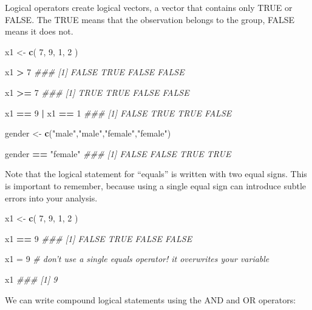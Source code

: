 \documentclass[]{book}
\newenvironment{Shaded}{\begin{snugshade}}{\end{snugshade}}
\newcommand{\CommentTok}[1]{\textcolor[rgb]{0.56,0.35,0.01}{\textit{#1}}}
\newcommand{\DecValTok}[1]{\textcolor[rgb]{0.00,0.00,0.81}{#1}}
\newcommand{\KeywordTok}[1]{\textcolor[rgb]{0.13,0.29,0.53}{\textbf{#1}}}
\newcommand{\NormalTok}[1]{#1}
\newcommand{\OperatorTok}[1]{\textcolor[rgb]{0.81,0.36,0.00}{\textbf{#1}}}
\newcommand{\StringTok}[1]{\textcolor[rgb]{0.31,0.60,0.02}{#1}}
\theoremstyle{definition}
\theoremstyle{definition}
\theoremstyle{definition}
\theoremstyle{remark}
\begin{document}
Logical operators create logical vectors, a vector that contains only
TRUE or FALSE. The TRUE means that the observation belongs to the group,
FALSE means it does not.

\begin{Shaded}
\begin{Highlighting}[]
\NormalTok{x1 <-}\StringTok{ }\KeywordTok{c}\NormalTok{( }\DecValTok{7}\NormalTok{, }\DecValTok{9}\NormalTok{, }\DecValTok{1}\NormalTok{, }\DecValTok{2}\NormalTok{ )}

\NormalTok{x1 }\OperatorTok{>}\StringTok{ }\DecValTok{7}
\CommentTok{### [1] FALSE  TRUE FALSE FALSE}

\NormalTok{x1 }\OperatorTok{>=}\StringTok{ }\DecValTok{7}
\CommentTok{### [1]  TRUE  TRUE FALSE FALSE}

\NormalTok{x1 }\OperatorTok{==}\StringTok{ }\DecValTok{9} \OperatorTok{|}\StringTok{ }\NormalTok{x1 }\OperatorTok{==}\StringTok{ }\DecValTok{1}
\CommentTok{### [1] FALSE  TRUE  TRUE FALSE}

\NormalTok{gender <-}\StringTok{ }\KeywordTok{c}\NormalTok{(}\StringTok{"male"}\NormalTok{,}\StringTok{"male"}\NormalTok{,}\StringTok{"female"}\NormalTok{,}\StringTok{"female"}\NormalTok{)}

\NormalTok{gender }\OperatorTok{==}\StringTok{ "female"}
\CommentTok{### [1] FALSE FALSE  TRUE  TRUE}
\end{Highlighting}
\end{Shaded}

Note that the logical statement for ``equals'' is written with two equal
signs. This is important to remember, because using a single equal sign
can introduce subtle errors into your analysis.

\begin{Shaded}
\begin{Highlighting}[]
\NormalTok{x1 <-}\StringTok{ }\KeywordTok{c}\NormalTok{( }\DecValTok{7}\NormalTok{, }\DecValTok{9}\NormalTok{, }\DecValTok{1}\NormalTok{, }\DecValTok{2}\NormalTok{ )}

\NormalTok{x1 }\OperatorTok{==}\StringTok{ }\DecValTok{9}
\CommentTok{### [1] FALSE  TRUE FALSE FALSE}

\NormalTok{x1 =}\StringTok{ }\DecValTok{9}  \CommentTok{# don't use a single equals operator!  it overwrites your variable}

\NormalTok{x1}
\CommentTok{### [1] 9}
\end{Highlighting}
\end{Shaded}

We can write compound logical statements using the AND and OR operators:
\end{document}
